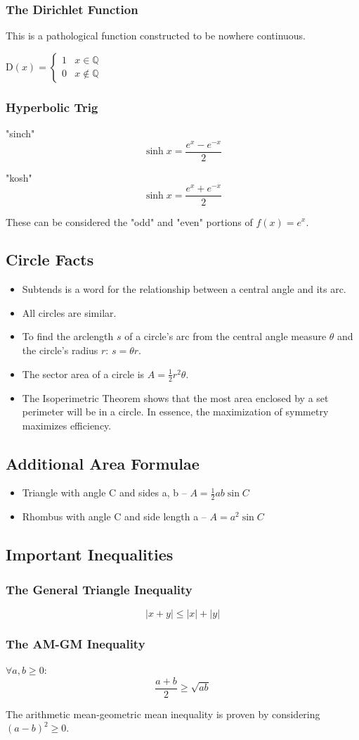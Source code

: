 \documentclass{article}
\begin{document}
\subsubsection{The Dirichlet Function}
This is a pathological function constructed to be nowhere continuous.

D$(x) = \begin{cases}
    1 & x\in\mathbb{Q}\\
    0 & x\notin\mathbb{Q}
\end{cases}$

\subsubsection{Hyperbolic Trig}
"sinch"
$$\sinh{x}=\frac{e^x-e^{-x}}{2}$$

"kosh"
$$\sinh{x}=\frac{e^x+e^{-x}}{2}$$

These can be considered the "odd" and "even" portions of $f(x)=e^x$.

\subsection{Circle Facts}
\begin{itemize}
    \item Subtends is a word for the relationship between a central angle and its arc.
    \item All circles are similar.
    \item To find the arclength $s$ of a circle's arc from the central angle measure $\theta$ and the circle's radius $r$: $s=\theta r$.
    \item The sector area of a circle is $A=\frac{1}{2}r^2\theta$.
    \item The Isoperimetric Theorem shows that the most area enclosed by a set perimeter will be in a circle. In essence, the maximization of symmetry maximizes efficiency.
\end{itemize}

\subsection{Additional Area Formulae}
\begin{itemize}
    \item Triangle with angle C and sides a, b -- $A=\frac{1}{2}ab\sin{C}$
    \item Rhombus with angle C and side length a -- $A=a^2\sin{C}$
\end{itemize}

\subsection{Important Inequalities}
\subsubsection{The General Triangle Inequality}
$$|x+y| \le |x| + |y|$$
\subsubsection{The AM-GM Inequality}
$\forall a,b \ge 0$:
$$\frac{a+b}{2}\ge\sqrt{ab}$$

The arithmetic mean-geometric mean inequality is proven by considering $(a-b)^2\ge0$.
\end{document}
